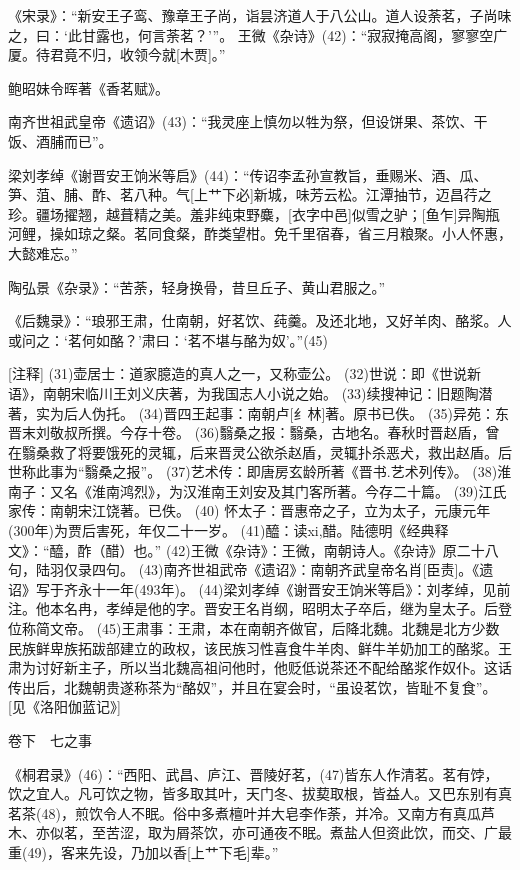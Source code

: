 \documentclass[12pt,UTF8]{ctexbook}
\begin{document}
《宋录》：“新安王子鸾、豫章王子尚，诣昙济道人于八公山。道人设荼茗，子尚味之，曰：‘此甘露也，何言荼茗？’”。
王微《杂诗》(42)：“寂寂掩高阁，寥寥空广厦。待君竟不归，收领今就[木贾]。” 

鲍昭妹令晖著《香茗赋》。 

南齐世祖武皇帝《遗诏》(43)：“我灵座上慎勿以牲为祭，但设饼果、茶饮、干饭、酒脯而已”。

梁刘孝绰《谢晋安王饷米等启》(44)：“传诏李孟孙宣教旨，垂赐米、酒、瓜、笋、菹、脯、酢、茗八种。气[上艹下必]新城，味芳云松。江潭抽节，迈昌荇之珍。疆场擢翘，越葺精之美。羞非纯束野麋，[衣字中邑]似雪之驴；[鱼乍]异陶瓶河鲤，操如琼之粲。茗同食粲，酢类望柑。免千里宿春，省三月粮聚。小人怀惠，大懿难忘。”

陶弘景《杂录》：“苦荼，轻身换骨，昔旦丘子、黄山君服之。”

《后魏录》：“琅邪王肃，仕南朝，好茗饮、莼羹。及还北地，又好羊肉、酪浆。人或问之：‘茗何如酪？’肃曰：‘茗不堪与酪为奴’。”(45)

[注释]
(31)壶居士：道家臆造的真人之一，又称壶公。
(32)世说：即《世说新语》，南朝宋临川王刘义庆著，为我国志人小说之始。
(33)续搜神记：旧题陶潜著，实为后人伪托。
(34)晋四王起事：南朝卢[纟林]著。原书已佚。
(35)异苑：东晋末刘敬叔所撰。今存十卷。
(36)翳桑之报：翳桑，古地名。春秋时晋赵盾，曾在翳桑救了将要饿死的灵辄，后来晋灵公欲杀赵盾，灵辄扑杀恶犬，救出赵盾。后世称此事为“翳桑之报”。
(37)艺术传：即唐房玄龄所著《晋书.艺术列传》。
(38)淮南子：又名《淮南鸿烈》，为汉淮南王刘安及其门客所著。今存二十篇。
(39)江氏家传：南朝宋江饶著。已佚。
(40) 怀太子：晋惠帝之子，立为太子，元康元年(300年)为贾后害死，年仅二十一岁。
(41)醯：读xi,醋。陆德明《经典释文》：“醯，酢（醋）也。”
(42)王微《杂诗》：王微，南朝诗人。《杂诗》原二十八句，陆羽仅录四句。
(43)南齐世祖武帝《遗诏》：南朝齐武皇帝名肖[臣责]。《遗诏》写于齐永十一年(493年)。
(44)梁刘孝绰《谢晋安王饷米等启》：刘孝绰，见前注。他本名冉，孝绰是他的字。晋安王名肖纲，昭明太子卒后，继为皇太子。后登位称简文帝。 
(45)王肃事：王肃，本在南朝齐做官，后降北魏。北魏是北方少数民族鲜卑族拓跋部建立的政权，该民族习性喜食牛羊肉、鲜牛羊奶加工的酪浆。王肃为讨好新主子，所以当北魏高祖问他时，他贬低说茶还不配给酪浆作奴仆。这话传出后，北魏朝贵遂称茶为“酪奴”，并且在宴会时，“虽设茗饮，皆耻不复食”。[见《洛阳伽蓝记》]

卷下　七之事

《桐君录》(46)：“西阳、武昌、庐江、晋陵好茗，(47)皆东人作清茗。茗有饽，饮之宜人。凡可饮之物，皆多取其叶，天门冬、拔葜取根，皆益人。又巴东别有真茗茶(48)，煎饮令人不眠。俗中多煮檀叶并大皂李作荼，并冷。又南方有真瓜芦木、亦似茗，至苦涩，取为屑茶饮，亦可通夜不眠。煮盐人但资此饮，而交、广最重(49)，客来先设，乃加以香[上艹下毛]辈。”
\end{document}
